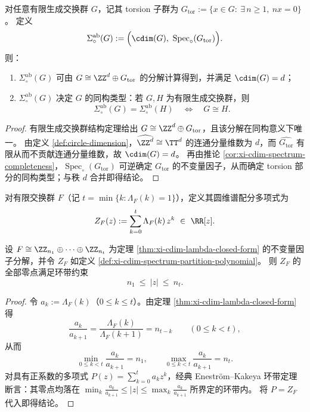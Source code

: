 \begin{proposition}\label{prop:xi-cdim-circle-ledger-signature}
对任意有限生成交换群 \(G\)，记其 torsion 子群为
\(
G_{\mathrm{tor}}:=\{x\in G:\ \exists\,n\ge 1,\ nx=0\}
\)。
定义
\[
\Sigma_{\circ}^{\mathrm{ab}}(G)
:=\Bigl(\cdim(G),\ \operatorname{Spec}_{\circ}(G_{\mathrm{tor}})\Bigr).
\]
则：
\begin{enumerate}
  \item \(\Sigma_{\circ}^{\mathrm{ab}}(G)\) 可由 \(G\cong \ZZ^{d}\oplus G_{\mathrm{tor}}\) 的分解计算得到，并满足 \(\cdim(G)=d\)；
  \item \(\Sigma_{\circ}^{\mathrm{ab}}(G)\) 决定 \(G\) 的同构类型：若 \(G,H\) 为有限生成交换群，则
  \[
  \Sigma_{\circ}^{\mathrm{ab}}(G)=\Sigma_{\circ}^{\mathrm{ab}}(H)
  \quad\Longleftrightarrow\quad
  G\cong H.
  \]
\end{enumerate}
\end{proposition}
\begin{proof}
有限生成交换群结构定理给出 \(G\cong \ZZ^{d}\oplus G_{\mathrm{tor}}\)，且该分解在同构意义下唯一。
由定义 \ref{def:circle-dimension}，\(\widehat{\ZZ^{d}}\cong \TT^{d}\) 的连通分量维数为 \(d\)，而 \(\widehat{G_{\mathrm{tor}}}\) 有限从而不贡献连通分量维数，故 \(\cdim(G)=d\)。
再由推论 \ref{cor:xi-cdim-spectrum-completeness}，\(\operatorname{Spec}_{\circ}(G_{\mathrm{tor}})\) 可逆确定 \(G_{\mathrm{tor}}\) 的不变量因子，从而确定 torsion 部分的同构类型；与秩 \(d\) 合并即得结论。
\end{proof}

\begin{definition}[圆维谱配分多项式]\label{def:xi-cdim-spectrum-partition-polynomial}
对有限交换群 \(F\)（记 \(t=\min\{k:\Lambda_F(k)=1\}\)），定义其圆维谱配分多项式为
\[
Z_F(z):=\sum_{k=0}^{t}\Lambda_F(k)\,z^{k}\ \in\ \RR[z].
\]
\end{definition}

\begin{theorem}\label{thm:xi-cdim-spectrum-zeros-annulus}
设 \(F\cong \ZZ_{n_1}\oplus\cdots\oplus\ZZ_{n_t}\) 为定理 \ref{thm:xi-cdim-lambda-closed-form} 的不变量因子分解，并令 \(Z_F\) 如定义 \ref{def:xi-cdim-spectrum-partition-polynomial}。
则 \(Z_F\) 的全部零点满足环带约束
\[
n_1\ \le\ |z|\ \le\ n_t.
\]
\end{theorem}
\begin{proof}
令 \(a_k:=\Lambda_F(k)\)（\(0\le k\le t\)）。由定理 \ref{thm:xi-cdim-lambda-closed-form} 得
\[
\frac{a_k}{a_{k+1}}=\frac{\Lambda_F(k)}{\Lambda_F(k+1)}=n_{t-k}\qquad(0\le k<t),
\]
从而
\[
\min_{0\le k<t}\frac{a_k}{a_{k+1}}=n_1,\qquad
\max_{0\le k<t}\frac{a_k}{a_{k+1}}=n_t.
\]
对具有正系数的多项式 \(P(z)=\sum_{k=0}^{t}a_k z^k\)，经典 Enestr\"om--Kakeya 环带定理断言：其零点均落在
\(
\min_{k}\frac{a_k}{a_{k+1}}\le |z|\le \max_{k}\frac{a_k}{a_{k+1}}
\)
所界定的环带内。
将 \(P=Z_F\) 代入即得结论。
\end{proof}


